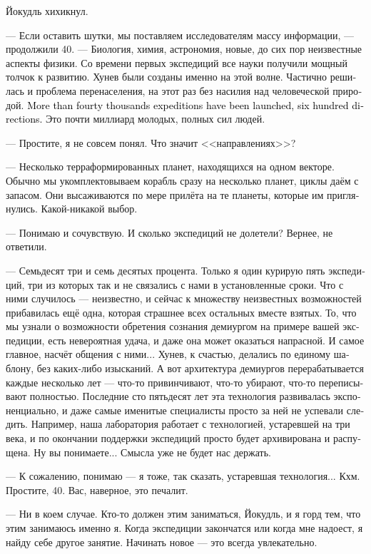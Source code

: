 \documentclass[a4paper,12pt,fleqn]{book}\usepackage{cooltooltips}\usepackage{polyglossia}\setdefaultlanguage[babelshorthands=true]{russian}\setotherlanguage{english}\defaultfontfeatures{Ligatures=TeX,Mapping=tex-text} \usepackage{xcolor}\definecolor{lightgray}{HTML}{bbbbbb}\color{lightgray}\newcommand{\ml}[3]{\textenglish{\textcolor{black}{#3}}}
\begin{document}
Йокудль хихикнул.

--- Если оставить шутки, мы поставляем исследователям массу информации, --- продолжили 40.
--- Биология, химия, астрономия, новые, до сих пор неизвестные аспекты физики.
Со времени первых экспедиций все науки получили мощный толчок к развитию.
Хунев были созданы именно на этой волне.
Частично решилась и проблема перенаселения, на этот раз без насилия над человеческой природой.
\ml{$0$}
{Запущены более сорока тысяч экспедиций в шестиста направлениях.}
{More than fourty thousands expeditions have been launched, six hundred directions.}
Это почти миллиард молодых, полных сил людей.

--- Простите, я не совсем понял.
Что значит <<направлениях>>?

--- Несколько терраформированных планет, находящихся на одном векторе.
Обычно мы укомплектовываем корабль сразу на несколько планет, циклы даём с запасом.
Они высаживаются по мере прилёта на те планеты, которые им приглянулись.
Какой-никакой выбор.

--- Понимаю и сочувствую.
И сколько экспедиций не долетели?
Вернее, не ответили.

--- Семьдесят три и семь десятых процента.
Только я один курирую пять экспедиций, три из которых так и не связались с нами в установленные сроки.
Что с ними случилось --- неизвестно, и сейчас к множеству неизвестных возможностей прибавилась ещё одна, которая страшнее всех остальных вместе взятых.
То, что мы узнали о возможности обретения сознания демиургом на примере вашей экспедиции, есть невероятная удача, и даже она может оказаться напрасной.
И самое главное, насчёт общения с ними...
Хунев, к счастью, делались по единому шаблону, без каких-либо изысканий.
А вот архитектура демиургов перерабатывается каждые несколько лет --- что-то привинчивают, что-то убирают, что-то переписывают полностью.
Последние сто пятьдесят лет эта технология развивалась экспоненциально, и даже самые именитые специалисты просто за ней не успевали следить.
Например, наша лаборатория работает с технологией, устаревшей на три века, и по окончании поддержки экспедиций просто будет архивирована и распущена.
Ну вы понимаете...
Смысла уже не будет нас держать.

--- К сожалению, понимаю --- я тоже, так сказать, устаревшая технология...
Кхм.
Простите, 40.
Вас, наверное, это печалит.

--- Ни в коем случае.
Кто-то должен этим заниматься, Йокудль, и я горд тем, что этим занимаюсь именно я.
Когда экспедиции закончатся или когда мне надоест, я найду себе другое занятие.
Начинать новое --- это всегда увлекательно.
\end{document}
